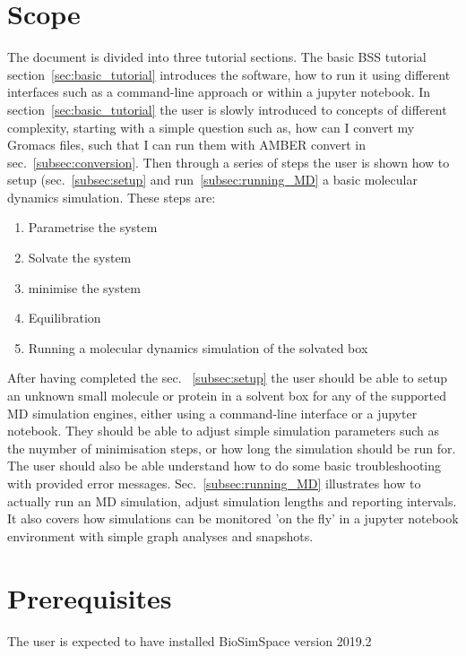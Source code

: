 \documentclass[9pt,tutorial]{livecoms}
\begin{document}
\section{Scope}
\label{sec:scope}
The document is divided into three tutorial sections. The basic BSS tutorial section~\ref{sec:basic_tutorial} introduces the software, how to run it using different interfaces such as a command-line approach or within a jupyter notebook. In section~\ref{sec:basic_tutorial} the user is slowly introduced to concepts of different complexity, starting with a simple question such as, how can I convert my Gromacs files, such that I can run them with AMBER convert in sec.~\ref{subsec:conversion}. Then through a series of steps the user is shown how to setup (sec.~\ref{subsec:setup} and run~\ref{subsec:running_MD} a basic molecular dynamics simulation. These steps are:
\begin{enumerate}
\item Parametrise the system 
\item Solvate the system
\item minimise the system
\item Equilibration
\item Running a molecular dynamics simulation of the solvated box
\end{enumerate}
After having completed the sec. ~\ref{subsec:setup} the user should be able to setup an unknown small molecule or protein in a solvent box for any of the supported MD simulation engines, either using a command-line interface or a jupyter notebook. They should be able to adjust simple simulation parameters such as the nuymber of minimisation steps, or how long the simulation should be run for. The user should also be able understand how to do some basic troubleshooting with provided error messages. 
Sec.~\ref{subsec:running_MD} illustrates how to actually run an MD simulation, adjust simulation lengths and reporting intervals. It also covers how simulations can be monitored 'on the fly' in a jupyter notebook environment with simple graph analyses and snapshots. 



\section{Prerequisites}
\label{sec:prerequisites}
The user is expected to have installed BioSimSpace version 2019.2 
\end{document}
